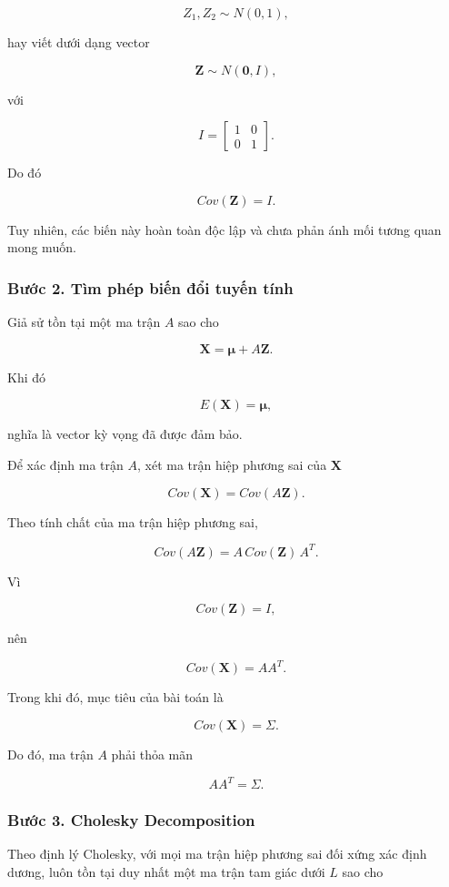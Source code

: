 \[
Z_1,Z_2\sim N(0,1),
\]

hay viết dưới dạng vector

\[
\mathbf Z
\sim
N(\mathbf0,I),
\]

với

\[
I=
\begin{bmatrix}
1&0\\
0&1
\end{bmatrix}.
\]

Do đó

\[
Cov(\mathbf Z)=I.
\]

Tuy nhiên, các biến này hoàn toàn độc lập và chưa phản ánh mối tương quan mong muốn.

\subsubsection*{Bước 2. Tìm phép biến đổi tuyến tính}

Giả sử tồn tại một ma trận \(A\) sao cho

\[
\boxed{
\mathbf X
=
\boldsymbol{\mu}
+
A\mathbf Z.
}
\]

Khi đó

\[
E(\mathbf X)
=
\boldsymbol{\mu},
\]

nghĩa là vector kỳ vọng đã được đảm bảo.

Để xác định ma trận \(A\), xét ma trận hiệp phương sai của \(\mathbf X\)

\[
Cov(\mathbf X)
=
Cov(A\mathbf Z).
\]

Theo tính chất của ma trận hiệp phương sai,

\[
Cov(A\mathbf Z)
=
A\,Cov(\mathbf Z)\,A^T.
\]

Vì

\[
Cov(\mathbf Z)=I,
\]

nên

\[
Cov(\mathbf X)
=
AA^T.
\]

Trong khi đó, mục tiêu của bài toán là

\[
Cov(\mathbf X)=\Sigma.
\]

Do đó, ma trận \(A\) phải thỏa mãn

\[
\boxed{
AA^T=\Sigma.
}
\]

\subsubsection*{Bước 3. Cholesky Decomposition}

Theo định lý Cholesky, với mọi ma trận hiệp phương sai đối xứng xác định dương, luôn tồn tại duy nhất một ma trận tam giác dưới \(L\) sao cho

